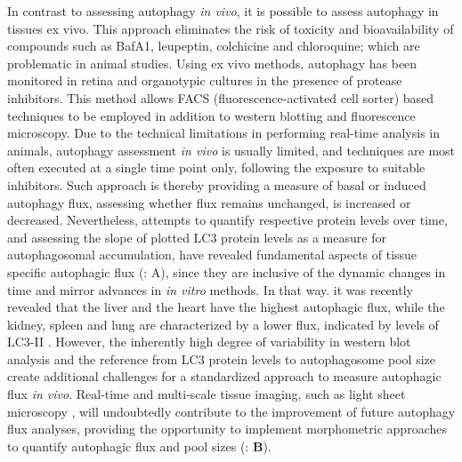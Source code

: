 In contrast to assessing autophagy \textit{in vivo}, it is possible to assess autophagy in tissues ex vivo. This approach eliminates the risk of toxicity and bioavailability of compounds such as BafA1, leupeptin, colchicine and chloroquine; which are problematic in animal studies. Using ex vivo methods, autophagy has been monitored in retina \citep{Esteban-Martinez2015} and organotypic cultures in the presence of protease inhibitors. This method allows FACS (fluorescence-activated cell sorter) based techniques to be employed in addition to western blotting and fluorescence microscopy. Due to the technical limitations in performing real-time analysis in animals, autophagy assessment \textit{in vivo} is usually limited, and techniques are most often executed at a single time point only, following the exposure to suitable inhibitors. Such approach is thereby providing a measure of basal or induced autophagy flux, assessing whether flux remains unchanged, is increased or decreased. Nevertheless, attempts to quantify respective protein levels over time, and assessing the slope of plotted LC3 protein levels as a measure for autophagosomal accumulation, have revealed fundamental aspects of tissue specific autophagic flux \citep{Haspel2011} (: A), since they are inclusive of the dynamic changes in time and mirror advances in \textit{in vitro} methods. In that way. it was recently revealed that the liver and the heart have the highest autophagic flux, while the kidney, spleen and lung are characterized by a lower flux, indicated by levels of LC3-II \citep{Haspel2011}. However, the inherently high degree of variability in western blot analysis and the reference from LC3 protein levels to autophagosome pool size create additional challenges for a standardized approach to measure autophagic flux \textit{in vivo}. Real-time and multi-scale tissue imaging, such as light sheet microscopy \citep{Pampaloni2013}, will undoubtedly contribute to the improvement of future autophagy flux analyses, providing the opportunity to implement morphometric approaches to quantify autophagic flux and pool sizes (: \textbf{B}). 

